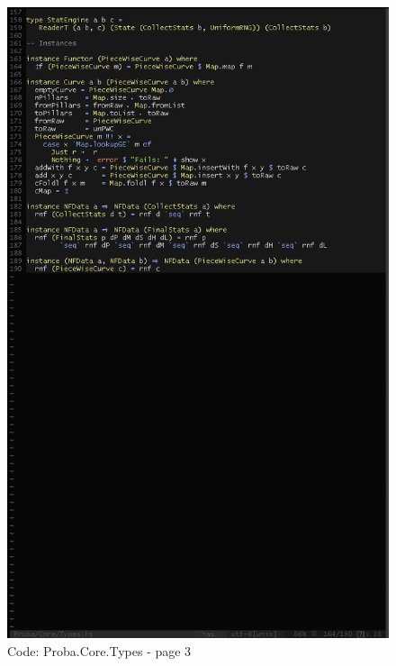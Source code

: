 \documentclass[12pt,a4paper,titlepage]{article}
\begin{document}
\begin{figure}[h!]
\centering
\includegraphics[width=1\textwidth]{img/code-types-3.png}
\caption{Code: Proba.Core.Types - page 3}
\label{fig:core.types3}
\end{figure}
\end{document}
